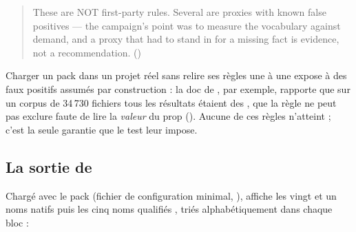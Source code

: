 \begin{quote}\small
\og These are NOT first-party rules. Several are proxies with known false positives --- the campaign's point was to measure the vocabulary against demand, and a proxy that had to stand in for a missing fact is evidence, not a recommendation.\fg{} ()
\end{quote}

\begin{piege}
Charger un pack  dans un projet réel sans relire ses règles une à une expose à des faux positifs assumés par construction : la doc de , par exemple, rapporte que sur un corpus de 34\,730 fichiers tous les résultats étaient des , que la règle ne peut pas exclure faute de lire la \emph{valeur} du prop  (). Aucune de ces règles n'atteint  ; c'est la seule garantie que le test leur impose.
\end{piege}

\subsection{La sortie de }

Chargé avec le pack  (fichier de configuration minimal, ),  affiche les vingt et un noms natifs puis les cinq noms qualifiés , triés alphabétiquement dans chaque bloc :

